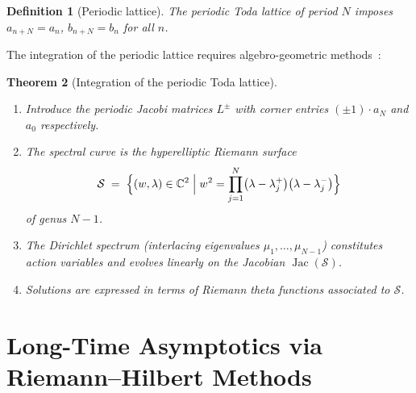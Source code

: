 \documentclass[12pt,a4paper]{article}
\newtheorem{theorem}{Theorem}[section]
\newtheorem{definition}[theorem]{Definition}
\theoremstyle{definition}
\newcommand{\C}{\mathbb{C}}
\begin{document}
\begin{definition}[Periodic lattice]
The \emph{periodic Toda lattice} of period $N$ imposes
$a_{n+N}=a_n$, $b_{n+N}=b_n$ for all $n$.
\end{definition}

The integration of the periodic lattice requires algebro-geometric
methods~\cite{Teschl2000,Toda1989}:

\begin{theorem}[Integration of the periodic Toda lattice]
\begin{enumerate}[label=(\roman*)]
  \item Introduce the \emph{periodic Jacobi matrices} $L^\pm$ with corner
        entries $(\pm 1)\cdot a_N$ and $a_0$ respectively.
  \item The \emph{spectral curve} is the hyperelliptic Riemann surface
        \[
          \mathcal{S} \;=\;
          \Bigl\{(w,\lambda)\in\C^2 \;\Big|\;
          w^2 = \prod_{j=1}^{N}\bigl(\lambda-\lambda_j^+\bigr)
                \bigl(\lambda-\lambda_j^-\bigr)\Bigr\}
        \]
        of genus $N-1$.
  \item The \emph{Dirichlet spectrum} (interlacing eigenvalues
        $\mu_1,\ldots,\mu_{N-1}$) constitutes action variables and evolves
        \emph{linearly} on the Jacobian $\operatorname{Jac}(\mathcal{S})$.
  \item Solutions are expressed in terms of \emph{Riemann theta functions}
        associated to $\mathcal{S}$.
\end{enumerate}
\end{theorem}

\section{Long-Time Asymptotics via Riemann--Hilbert Methods}
\label{sec:LTA}
\end{document}
